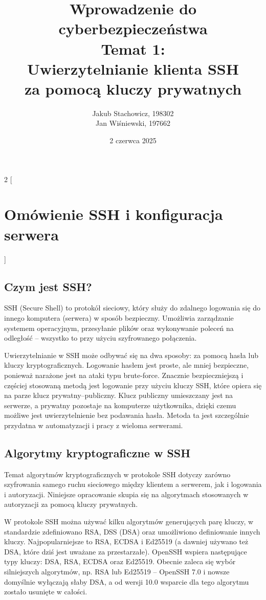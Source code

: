 \documentclass{article}
\title{Wprowadzenie do cyberbezpieczeństwa\\Temat 1:\\Uwierzytelnianie klienta SSH\\za pomocą kluczy prywatnych}
\author{Jakub Stachowicz, 198302\\Jan Wiśniewski, 197662}
\date{2 czerwca 2025}
\begin{document}
\maketitle
\newpage
\tableofcontents
\newpage


\begin{multicols}{2}
[
\section{Omówienie SSH i konfiguracja serwera}
]
\subsection{Czym jest SSH?}
SSH (Secure Shell) to protokół sieciowy, który służy do zdalnego logowania się do innego komputera (serwera) w sposób bezpieczny. Umożliwia zarządzanie systemem operacyjnym, przesyłanie plików oraz wykonywanie poleceń na odległość -- wszystko to przy użyciu szyfrowanego połączenia\cite[The SSH protocol]{whatisssh}.

Uwierzytelnianie w SSH może odbywać się na dwa sposoby: za pomocą hasła lub kluczy kryptograficznych. Logowanie hasłem jest proste, ale mniej bezpieczne, ponieważ narażone jest na ataki typu brute-force. Znacznie bezpieczniejszą i częściej stosowaną metodą jest logowanie przy użyciu kluczy SSH, które opiera się na parze klucz prywatny–publiczny. Klucz publiczny umieszczany jest na serwerze, a prywatny pozostaje na komputerze użytkownika, dzięki czemu możliwe jest uwierzytelnienie bez podawania hasła. Metoda ta jest szczególnie przydatna w automatyzacji i pracy z wieloma serwerami\cite[Automate with SSH keys, but manage them]{whatisssh}.

\subsection{Algorytmy kryptograficzne w SSH}
Temat algorytmów kryptograficznych w protokole SSH dotyczy zarówno szyfrowania samego ruchu sieciowego między klientem a serwerem, jak i logowania i autoryzacji. Niniejsze opracowanie skupia się na algorytmach stosowanych w autoryzacji za pomocą kluczy prywatnych.

W protokole SSH można używać kilku algorytmów generujących parę kluczy, w standardzie zdefiniowano RSA, DSS (DSA) oraz umożliwiono definiowanie innych kluczy\cite[6.6.~s.~13]{rfc4253}. Najpopularniejsze to RSA, ECDSA i Ed25519 (a dawniej używano też DSA, które dziś jest uważane za przestarzałe). OpenSSH wspiera następujące typy kluczy: DSA, RSA, ECDSA oraz Ed25519\cite[User key generation]{learnms}. Obecnie zaleca się wybór silniejszych algorytmów, np. RSA lub Ed25519 -- OpenSSH 7.0 i nowsze domyślnie wyłączają słaby DSA, a od wersji 10.0 wsparcie dla tego algorytmu zostało usunięte w całości\cite{openssh10}.


\end{multicols}
\end{document}

